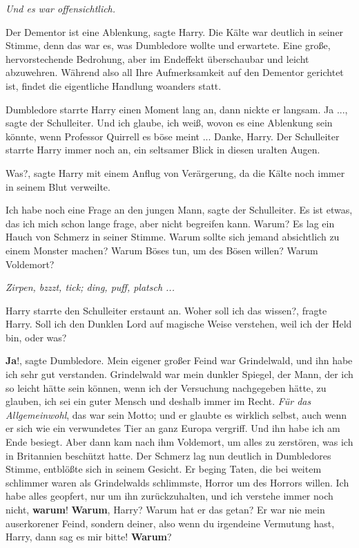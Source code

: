 \emph{Und es war offensichtlich.}

\glqq{}Der Dementor ist eine Ablenkung\grqq{}, sagte Harry. Die Kälte war
deutlich in seiner Stimme, denn das war es, was Dumbledore wollte und erwartete.
\glqq{}Eine große, hervorstechende Bedrohung, aber im Endeffekt überschaubar und
leicht abzuwehren. Während also all Ihre Aufmerksamkeit auf den Dementor
gerichtet ist, findet die eigentliche Handlung woanders statt.\grqq{}

Dumbledore starrte Harry einen Moment lang an, dann nickte er langsam. \glqq{}Ja
...\grqq{}, sagte der Schulleiter. \glqq{}Und ich glaube, ich weiß, wovon es eine
Ablenkung sein könnte, wenn Professor Quirrell es böse meint ... Danke,
Harry.\grqq{} Der Schulleiter starrte Harry immer noch an, ein seltsamer Blick
in diesen uralten Augen.

\glqq{}Was?\grqq{}, sagte Harry mit einem Anflug von Verärgerung, da die Kälte
noch immer in seinem Blut verweilte.

\glqq{}Ich habe noch eine Frage an den jungen Mann\grqq{}, sagte der Schulleiter.
\glqq{}Es ist etwas, das ich mich schon lange frage, aber nicht begreifen kann.
Warum?\grqq{} Es lag ein Hauch von Schmerz in seiner Stimme. \glqq{}Warum sollte
sich jemand absichtlich zu einem Monster machen? Warum Böses tun, um des Bösen
willen? Warum Voldemort?\grqq{}

\emph{Zirpen, bzzzt, tick; ding, puff, platsch ...}

Harry starrte den Schulleiter erstaunt an. \glqq{}Woher soll ich das
wissen?\grqq{}, fragte Harry. \glqq{}Soll ich den Dunklen Lord auf magische Weise
verstehen, weil ich der Held bin, oder was?\grqq{}

\glqq{}\textbf{Ja}!\grqq{}, sagte Dumbledore. \glqq{}Mein eigener großer Feind war
Grindelwald, und ihn habe ich sehr gut verstanden. Grindelwald war mein dunkler
Spiegel, der Mann, der ich so leicht hätte sein können, wenn ich der Versuchung
nachgegeben hätte, zu glauben, ich sei ein guter Mensch und deshalb immer im
Recht. \emph{Für das Allgemeinwohl}, das war sein Motto; und er glaubte es
wirklich selbst, auch wenn er sich wie ein verwundetes Tier an ganz Europa
vergriff. Und ihn habe ich am Ende besiegt. Aber dann kam nach ihm Voldemort, um
alles zu zerstören, was ich in Britannien beschützt hatte.\grqq{} Der Schmerz
lag nun deutlich in Dumbledores Stimme, entblößte sich in seinem Gesicht. \glqq{}
Er beging Taten, die bei weitem schlimmer waren als Grindelwalds schlimmste,
Horror um des Horrors willen. Ich habe alles geopfert, nur um ihn
zurückzuhalten, und ich verstehe immer noch nicht, \textbf{warum}!
\textbf{Warum}, Harry? Warum hat er das getan? Er war nie mein auserkorener
Feind, sondern deiner, also wenn du irgendeine Vermutung hast, Harry, dann sag
es mir bitte! \textbf{Warum}?\grqq{}

